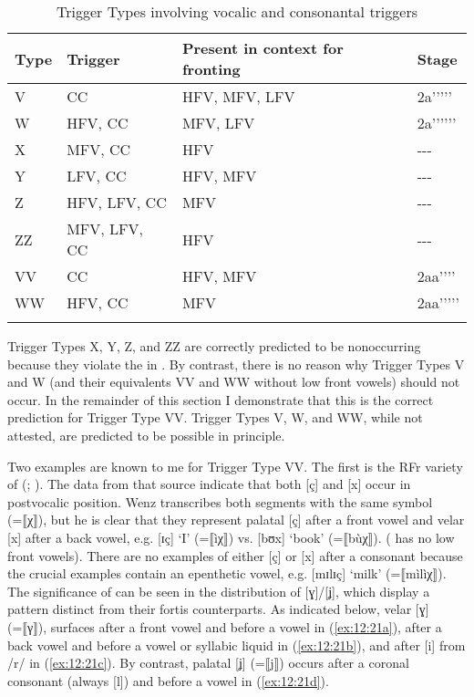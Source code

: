 \begin{table}
\caption{Trigger Types involving vocalic and consonantal triggers\label{tab:12.32}}
\begin{tabular}{llll}
\lsptoprule
Type & Trigger & Present in context for fronting & Stage\\\midrule
V & CC & HFV, MFV, LFV & 2a'{}'{}'{}'{}'\\
W & HFV, CC & MFV, LFV & 2a'{}'{}'{}'{}'{}'\\
X & MFV, CC & HFV & {}-{}-{}-\\
Y & LFV, CC & HFV, MFV & {}-{}-{}-\\
Z & HFV, LFV, CC & MFV & {}-{}-{}-\\
ZZ & MFV, LFV, CC & HFV & {}-{}-{}-\\\tablevspace
VV & CC & HFV, MFV & 2aa'{}'{}'{}'\\
WW & HFV, CC & MFV & 2aa'{}'{}'{}'{}'\\
\lspbottomrule
\end{tabular}
\end{table}

Trigger Types X, Y, Z, and ZZ are correctly predicted to be nonoccurring because they violate the  in . By contrast, there is no reason why Trigger Types V and W (and their equivalents VV and WW without low front vowels) should not occur. In the remainder of this section I demonstrate that this is the correct prediction for Trigger Type VV. Trigger Types V, W, and WW, while not attested, are predicted to be possible in principle.

Two examples are known to me for Trigger Type VV. The first is the RFr variety of  (\citealt{Wenz1911}; ). The data from that source indicate that both [ç] and [x] occur in postvocalic position. Wenz transcribes both segments with the same symbol (=⟦χ⟧), but he is clear that they represent palatal [ç] after a front vowel and velar [x] after a back vowel, e.g. [ɪç] ‘I’ (=⟦ìχ⟧) vs. [bʊx] ‘book’ (=⟦bùχ⟧). ( has no low front vowels). There are no examples of either [ç] or [x] after a consonant because the crucial examples contain an epenthetic vowel, e.g. [mɪlɪç] ‘milk’ (=⟦mìlìχ⟧). The significance of  can be seen in the distribution of [ɣ]/[ʝ], which display a pattern distinct from their fortis counterparts. As indicated below, velar [ɣ] (=⟦γ⟧), surfaces after a front vowel and before a vowel in (\ref{ex:12:21a}), after a back vowel and before a vowel or syllabic liquid in (\ref{ex:12:21b}), and after [i] from /r/ in (\ref{ex:12:21c}). By contrast, palatal [ʝ] (=⟦j⟧) occurs after a coronal consonant (always [l]) and before a vowel in (\ref{ex:12:21d}).

